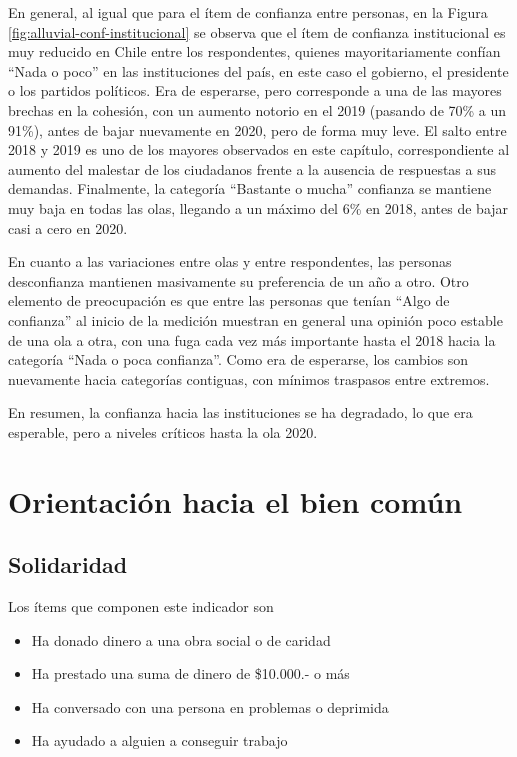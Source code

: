 \documentclass[
  12pt,
]{book}
\begin{document}
En general, al igual que para el ítem de confianza entre personas, en la Figura \ref{fig:alluvial-conf-institucional} se observa que el ítem de confianza institucional es muy reducido en Chile entre los respondentes, quienes mayoritariamente confían ``Nada o poco'' en las instituciones del país, en este caso el gobierno, el presidente o los partidos políticos. Era de esperarse, pero corresponde a una de las mayores brechas en la cohesión, con un aumento notorio en el 2019 (pasando de 70\% a un 91\%), antes de bajar nuevamente en 2020, pero de forma muy leve. El salto entre 2018 y 2019 es uno de los mayores observados en este capítulo, correspondiente al aumento del malestar de los ciudadanos frente a la ausencia de respuestas a sus demandas. Finalmente, la categoría ``Bastante o mucha'' confianza se mantiene muy baja en todas las olas, llegando a un máximo del 6\% en 2018, antes de bajar casi a cero en 2020.

En cuanto a las variaciones entre olas y entre respondentes, las personas desconfianza mantienen masivamente su preferencia de un año a otro. Otro elemento de preocupación es que entre las personas que tenían ``Algo de confianza'' al inicio de la medición muestran en general una opinión poco estable de una ola a otra, con una fuga cada vez más importante hasta el 2018 hacia la categoría ``Nada o poca confianza''. Como era de esperarse, los cambios son nuevamente hacia categorías contiguas, con mínimos traspasos entre extremos.

En resumen, la confianza hacia las instituciones se ha degradado, lo que era esperable, pero a niveles críticos hasta la ola 2020.

\hypertarget{orientaciuxf3n-hacia-el-bien-comuxfan-1}{%
\section{Orientación hacia el bien común}\label{orientaciuxf3n-hacia-el-bien-comuxfan-1}}

\hypertarget{solidaridad}{%
\subsection{Solidaridad}\label{solidaridad}}

Los ítems que componen este indicador son

\begin{itemize}
\item
  Ha donado dinero a una obra social o de caridad
\item
  Ha prestado una suma de dinero de \$10.000.- o más
\item
  Ha conversado con una persona en problemas o deprimida
\item
  Ha ayudado a alguien a conseguir trabajo
\end{itemize}
\end{document}

